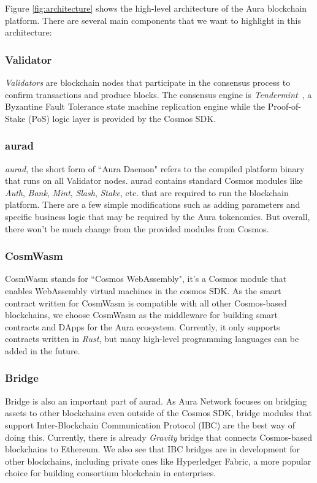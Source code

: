 \documentclass[12pt]{article}
\begin{document}
Figure \ref{fig:architecture} shows the high-level architecture of the Aura blockchain platform. There are several main components that we want to highlight in this architecture:

\subsubsection*{Validator}
\emph{Validators} are blockchain nodes that participate in the consensus process to confirm transactions and produce blocks.
The consensus engine is \emph{Tendermint}~\cite{buchman2016tendermint}, a Byzantine Fault Tolerance state machine replication engine while the Proof-of-Stake (PoS) logic layer is provided by the Cosmos SDK. 

\subsubsection*{aurad}
\emph{aurad}, the short form of ``Aura Daemon" refers to the compiled platform binary that runs on all Validator nodes. aurad contains standard Cosmos modules like \emph{Auth}, \emph{Bank}, \emph{Mint}, \emph{Slash}, \emph{Stake}, etc. that are required to run the blockchain platform. There are a few simple modifications such as adding parameters and specific business logic that may be required by the Aura tokenomics. But overall, there won't be much change from the provided modules from Cosmos.

\subsubsection*{CosmWasm}
CosmWasm stands for ``Cosmos WebAssembly", it's a Cosmos module that enables WebAssembly virtual machines in the cosmos SDK. As the smart contract written for CosmWasm is compatible with all other Cosmos-based blockchains, we choose CosmWasm as the middleware for building smart contracts and DApps for the Aura ecosystem. Currently, it only supports contracts written in \emph{Rust}, but many high-level programming languages can be added in the future.

\subsubsection*{Bridge}
Bridge is also an important part of aurad. As Aura Network focuses on bridging assets to other blockchains even outside of the Cosmos SDK, bridge modules that support  Inter-Blockchain Communication Protocol (IBC) are the best way of doing this. Currently, there is already \emph{Gravity} bridge that connects Cosmos-based blockchains to Ethereum. We also see that IBC bridges are in development for other blockchains, including private ones like Hyperledger Fabric, a more popular choice for building consortium blockchain in enterprises. 
\end{document}
